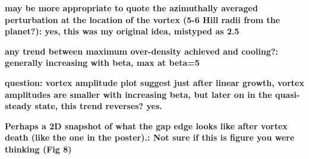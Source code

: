 {\bf may be more appropriate to quote the azimuthally averaged
  perturbation at the location of the vortex (5-6 Hill radii from the
  planet?): yes, this was my original idea, mistyped as 2.5
} 

{\bf any trend between maximum over-density achieved and cooling?: generally increasing with beta, max at beta=5} 

{\bf question: vortex amplitude plot suggest just after linear growth,
  vortex amplitudes are smaller with increasing beta, but later on in
  the quasi-steady state, this trend reverses? yes. 
}


{\bf Perhaps a 2D snapshot of what the gap edge looks like after
  vortex death (like the one in the poster).: Not sure if this is figure 
you were thinking (Fig 8)
}

